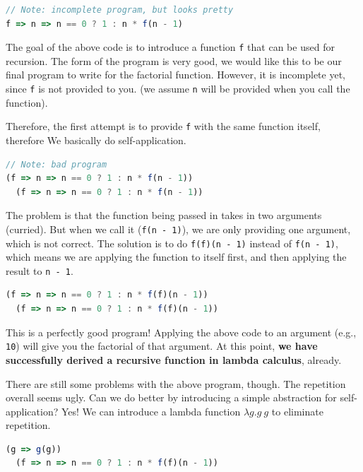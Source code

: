 \documentclass[12pt]{article}
\begin{document}
\begin{lstlisting}[frame=single,language=javascript,basicstyle=\ttfamily]
// Note: incomplete program, but looks pretty
f => n => n == 0 ? 1 : n * f(n - 1)
\end{lstlisting}

The goal of the above code is to introduce a function \texttt{f} that can be used for recursion.
The form of the program is very good, we would like this to be our final program to write for the factorial function.
However, it is incomplete yet, since \texttt{f} is not provided to you.
(we assume \texttt{n} will be provided when you call the function).

Therefore, the first attempt is to provide \texttt{f} with the same function itself, therefore
We basically do self-application.

\begin{lstlisting}[frame=single,language=javascript,basicstyle=\ttfamily]
// Note: bad program
(f => n => n == 0 ? 1 : n * f(n - 1))
  (f => n => n == 0 ? 1 : n * f(n - 1))
\end{lstlisting}

The problem is that the function being passed in takes in two arguments (curried).
But when we call it (\texttt{f(n - 1)}), we are only providing one argument, which is not correct.
The solution is to do \texttt{f(f)(n - 1)} instead of \texttt{f(n - 1)}, which means we are applying the function to itself first, and then applying the result to \texttt{n - 1}.

\begin{lstlisting}[frame=single,language=javascript,basicstyle=\ttfamily]
(f => n => n == 0 ? 1 : n * f(f)(n - 1))
  (f => n => n == 0 ? 1 : n * f(f)(n - 1))
\end{lstlisting}

This is a perfectly good program!
Applying the above code to an argument (e.g., \texttt{10}) will give you the factorial of that argument.
At this point, \textbf{we have successfully derived a recursive function in lambda calculus}, already.

There are still some problems with the above program, though.
The repetition overall seems ugly.
Can we do better by introducing a simple abstraction for self-application?
Yes! 
We can introduce a lambda function $\lambda g.g~g$ to eliminate repetition.

\begin{lstlisting}[frame=single,language=javascript,basicstyle=\ttfamily]
(g => g(g))
  (f => n => n == 0 ? 1 : n * f(f)(n - 1))
\end{lstlisting}
\end{document}

